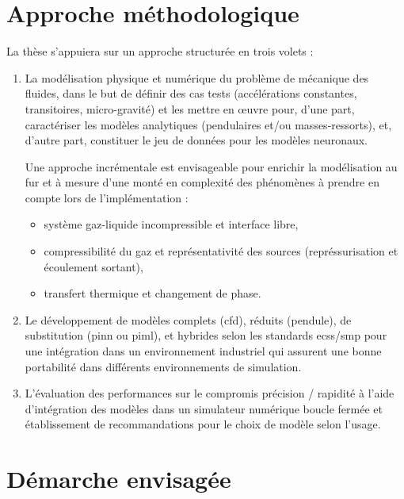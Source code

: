 \documentclass[12pt]{article}
\begin{document}
	
	\section*{Approche méthodologique}
	
	La thèse s’appuiera sur un approche structurée en trois volets :
	\begin{enumerate}
		\item La modélisation physique et numérique du problème de mécanique des fluides, dans le but de définir des cas tests (accélérations constantes, transitoires, micro-gravité) et les mettre en œuvre pour, d'une part, caractériser les modèles analytiques (pendulaires et/ou masses-ressorts), et, d'autre part, constituer le jeu de données pour les modèles neuronaux.
		
		Une approche incrémentale est envisageable pour enrichir la modélisation au fur et à mesure d'une monté en complexité des phénomènes à prendre en compte lors de l'implémentation :
		\begin{itemize}
			\item système gaz-liquide incompressible et interface libre,
			\item compressibilité du gaz et représentativité des sources (représsurisation et écoulement sortant),
			\item transfert thermique et changement de phase.
		\end{itemize}
		
		\item Le développement de modèles complets (\acrshort{cfd}), réduits (pendule), de substitution (\gls{pinn} ou \acrshort{piml}), et hybrides selon les standards \acrshort{ecss}/\acrshort{smp} pour une intégration dans un environnement industriel qui assurent une bonne portabilité dans différents environnements de simulation.
		
		\item L'évaluation des performances sur le compromis précision / rapidité à l'aide d'intégration des modèles dans un simulateur numérique boucle fermée et établissement de recommandations pour le choix de modèle selon l'usage.	
		
	\end{enumerate}
	
	\section*{Démarche envisagée}
	
\end{document}
